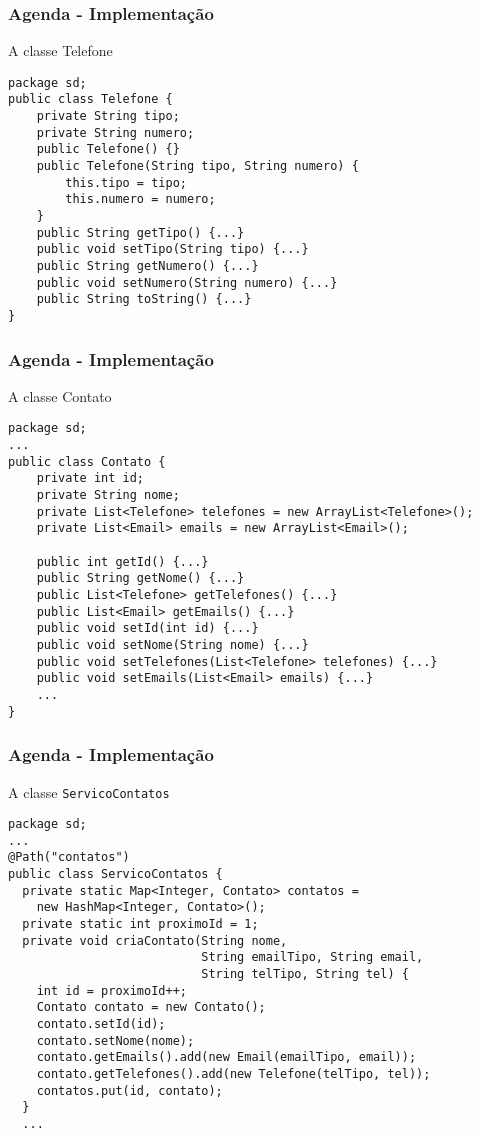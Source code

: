 \documentclass[Ligatures=TeX,table,brazil,svgnames,usetotalslideindicator,comp
ress,10pt]{beamer}
\begin{document}
\begin{frame}[fragile]
  \frametitle{Agenda - Implementação}
  A classe Telefone
  \begin{verbatim}
package sd;
public class Telefone {
    private String tipo;
    private String numero;
    public Telefone() {}
    public Telefone(String tipo, String numero) {
        this.tipo = tipo;
        this.numero = numero;
    }
    public String getTipo() {...}
    public void setTipo(String tipo) {...}
    public String getNumero() {...}
    public void setNumero(String numero) {...}
    public String toString() {...}
}
\end{verbatim}

\end{frame}

\begin{frame}[fragile]
  \frametitle{Agenda - Implementação}
  A classe Contato
{\footnotesize
\begin{verbatim}
package sd;
...
public class Contato {
    private int id;
    private String nome;
    private List<Telefone> telefones = new ArrayList<Telefone>();
    private List<Email> emails = new ArrayList<Email>();

    public int getId() {...}
    public String getNome() {...}
    public List<Telefone> getTelefones() {...}
    public List<Email> getEmails() {...}
    public void setId(int id) {...}
    public void setNome(String nome) {...}
    public void setTelefones(List<Telefone> telefones) {...}
    public void setEmails(List<Email> emails) {...}
    ...
}
\end{verbatim}
}
\end{frame}


\begin{frame}[fragile]
  \frametitle{Agenda - Implementação}
  A classe \texttt{ServicoContatos}
{\footnotesize
\begin{verbatim}
package sd;
...
@Path("contatos")
public class ServicoContatos {
  private static Map<Integer, Contato> contatos =
    new HashMap<Integer, Contato>();
  private static int proximoId = 1;
  private void criaContato(String nome,
                           String emailTipo, String email,
                           String telTipo, String tel) {
    int id = proximoId++;
    Contato contato = new Contato();
    contato.setId(id);
    contato.setNome(nome);
    contato.getEmails().add(new Email(emailTipo, email));
    contato.getTelefones().add(new Telefone(telTipo, tel));
    contatos.put(id, contato);
  }
  ...
\end{verbatim}
}
\end{frame}
\end{document}
